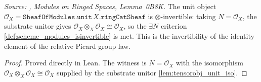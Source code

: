 \begin{lemma}\leanok
  \label{lem:unit_isinvertible}
  \textit{Source: \cite{stacks-project}, Modules on Ringed Spaces, Lemma~0B8K.}
  The unit object \(\mathcal{O}_X = \mathtt{SheafOfModules.unit}\,X.\mathtt{ringCatSheaf}\)
  is \(\otimes\)-invertible: taking \(N = \mathcal{O}_X\), the substrate unitor gives
  \(\mathcal{O}_X \otimes_X \mathcal{O}_X \cong \mathcal{O}_X\), so the \(\exists N\)
  criterion \cref{def:scheme_modules_isinvertible} is met. This is the invertibility of
  the identity element of the relative Picard group law.
\end{lemma}
\begin{proof}
  \leanok
  Proved directly in Lean. The witness is \(N = \mathcal{O}_X\) with the isomorphism
  \(\mathcal{O}_X \otimes_X \mathcal{O}_X \cong \mathcal{O}_X\) supplied by the substrate
  unitor \cref{lem:tensorobj_unit_iso}.
\end{proof}

